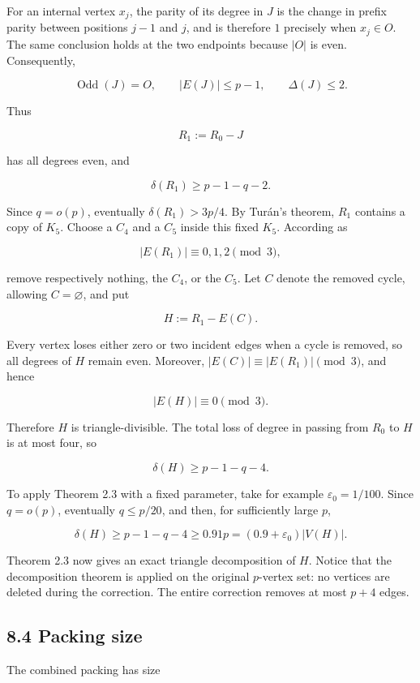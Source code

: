 \documentclass[
  11pt,
]{article}
\begin{document}
For an internal vertex \(x_j\), the parity of its degree in \(J\) is the
change in prefix parity between positions \(j-1\) and \(j\), and is
therefore \(1\) precisely when \(x_j\in O\). The same conclusion holds
at the two endpoints because \(|O|\) is even. Consequently,

\[
\operatorname{Odd}(J)=O,
\qquad
|E(J)|\le p-1,
\qquad
\Delta(J)\le2.
\tag{8.6}
\]

Thus

\[
R_1:=R_0-J
\]

has all degrees even, and

\[
\delta(R_1)\ge p-1-q-2.
\tag{8.7}
\]

Since \(q=o(p)\), eventually \(\delta(R_1)>3p/4\). By Turán's theorem,
\(R_1\) contains a copy of \(K_5\). Choose a \(C_4\) and a \(C_5\)
inside this fixed \(K_5\). According as

\[
|E(R_1)|\equiv0,1,2\pmod3,
\]

remove respectively nothing, the \(C_4\), or the \(C_5\). Let \(C\)
denote the removed cycle, allowing \(C=\varnothing\), and put

\[
H:=R_1-E(C).
\]

Every vertex loses either zero or two incident edges when a cycle is
removed, so all degrees of \(H\) remain even. Moreover,
\(|E(C)|\equiv |E(R_1)|\pmod3\), and hence

\[
|E(H)|\equiv0\pmod3.
\]

Therefore \(H\) is triangle-divisible. The total loss of degree in
passing from \(R_0\) to \(H\) is at most four, so

\[
\delta(H)\ge p-1-q-4.
\tag{8.8}
\]

To apply Theorem 2.3 with a fixed parameter, take for example
\(\varepsilon_0=1/100\). Since \(q=o(p)\), eventually \(q\le p/20\), and
then, for sufficiently large \(p\),

\[
\delta(H)\ge p-1-q-4\ge0.91p=(0.9+\varepsilon_0)|V(H)|.
\tag{8.9}
\]

Theorem 2.3 now gives an exact triangle decomposition of \(H\). Notice
that the decomposition theorem is applied on the original \(p\)-vertex
set: no vertices are deleted during the correction. The entire
correction removes at most \(p+4\) edges.

\subsection{8.4 Packing size}\label{packing-size}

The combined packing has size
\end{document}
